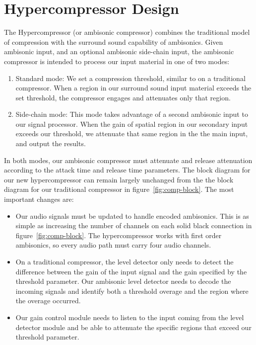 \section{Hypercompressor Design}
\label{sec:hypercomp-design}
The Hypercompressor (or ambisonic compressor) combines the traditional
model of compression with the surround sound capability of
ambisonics. Given ambisonic input, and an optional ambisonic
side-chain input, the ambisonic compressor is intended to process our
input material in one of two modes:
\begin{enumerate}
\item Standard mode: We set a compression threshold, similar to on a
  traditional compressor. When a region in our surround sound input
  material exceeds the set threshold, the compressor engages and
  attenuates only that region.
\item Side-chain mode: This mode takes advantage of a second ambisonic
  input to our signal processor. When the gain of spatial region in
  our secondary input exceeds our threshold, we attenuate that same
  region in the the main input, and output the results.
\end{enumerate}
In both modes, our ambisonic compressor must attenuate and release
attenuation according to the attack time and release time
parameters. The block diagram for our new hypercompressor can remain
largely unchanged from the the block diagram for our traditional
compressor in figure~\ref{fig:comp-block}. The most important changes
are:
\begin{itemize}
\item Our audio signals must be updated to handle encoded
  ambisonics. This is as simple as increasing the number of channels
  on each solid black connection in figure~\ref{fig:comp-block}. The
  hypercompressor works with first order ambisonics, so every audio
  path must carry four audio channels.
\item On a traditional compressor, the level detector only needs to
  detect the difference between the gain of the input signal and the
  gain specified by the threshold parameter. Our ambisonic level detector
  needs to decode the incoming signals and identify both a threshold
  overage and the region where the overage occurred.
\item Our gain control module needs to listen to the input coming from
  the level detector module and be able to attenuate the specific
  regions that exceed our threshold parameter.
\end{itemize}

